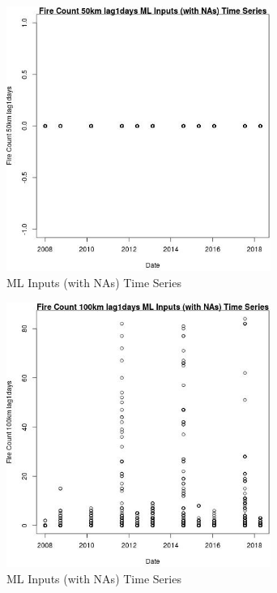 \begin{figure} 
\centering  
\includegraphics[width=0.77\textwidth]{Code_Outputs/Report_ML_input_PM25_Step4_part_e_de_duplicated_aves_compiled_2019-05-18wNAs_Fire_Count_50km_lag1daysvDate.jpg} 
\caption{\label{fig:Report_ML_input_PM25_Step4_part_e_de_duplicated_aves_compiled_2019-05-18wNAsFire_Count_50km_lag1daysvDate}ML Inputs (with NAs) Time Series} 
\end{figure} 
 

\begin{figure} 
\centering  
\includegraphics[width=0.77\textwidth]{Code_Outputs/Report_ML_input_PM25_Step4_part_e_de_duplicated_aves_compiled_2019-05-18wNAs_Fire_Count_100km_lag1daysvDate.jpg} 
\caption{\label{fig:Report_ML_input_PM25_Step4_part_e_de_duplicated_aves_compiled_2019-05-18wNAsFire_Count_100km_lag1daysvDate}ML Inputs (with NAs) Time Series} 
\end{figure} 
 

